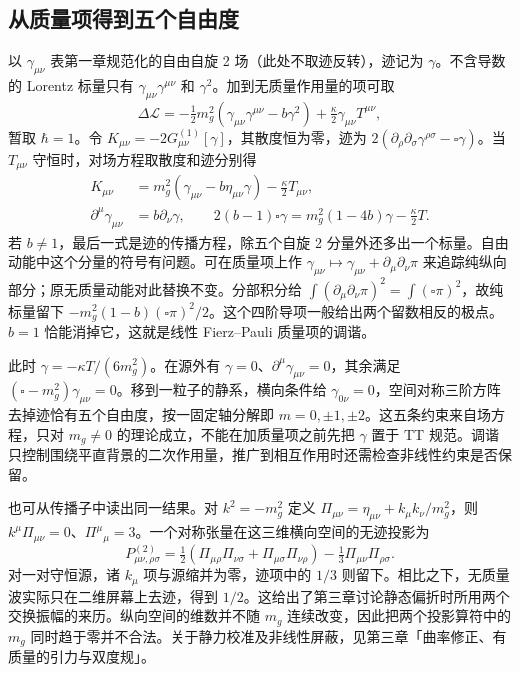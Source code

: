 \subsection{从质量项得到五个自由度}

以 $\gamma_{\mu\nu}$ 表第一章规范化的自由自旋 2 场（此处不取迹反转），迹记为 $\gamma$。不含导数的 Lorentz 标量只有 $\gamma_{\mu\nu}\gamma^{\mu\nu}$ 和 $\gamma^2$。加到无质量作用量的项可取
\[
 \Delta\mathscr L=-\tfrac12 m_g^2
        (\gamma_{\mu\nu}\gamma^{\mu\nu}-b\gamma^2)
        +\tfrac{\kappa}{2}\gamma_{\mu\nu}T^{\mu\nu},
\]
暂取 $\hbar=1$。令 $K_{\mu\nu}=-2G_{\mu\nu}^{(1)}[\gamma]$，其散度恒为零，迹为 $2(\partial_\rho\partial_\sigma\gamma^{\rho\sigma}-\square\gamma)$。当 $T_{\mu\nu}$ 守恒时，对场方程取散度和迹分别得
\begin{align*}
 K_{\mu\nu}&=m_g^2(\gamma_{\mu\nu}-b\eta_{\mu\nu}\gamma)-\tfrac\kappa2 T_{\mu\nu},\\
 \partial^\mu\gamma_{\mu\nu}&=b\partial_\nu\gamma,\qquad
 2(b-1)\square\gamma=m_g^2(1-4b)\gamma-\tfrac\kappa2 T .
\end{align*}
若 $b\ne1$，最后一式是迹的传播方程，除五个自旋 2 分量外还多出一个标量。自由动能中这个分量的符号有问题。可在质量项上作 $\gamma_{\mu\nu}\mapsto\gamma_{\mu\nu}+\partial_\mu\partial_\nu\pi$ 来追踪纯纵向部分；原无质量动能对此替换不变。分部积分给 $\int(\partial_\mu\partial_\nu\pi)^2=\int(\square\pi)^2$，故纯标量留下 $-m_g^2(1-b)(\square\pi)^2/2$。这个四阶导项一般给出两个留数相反的极点。$b=1$ 恰能消掉它，这就是线性 Fierz--Pauli 质量项的调谐。

此时 $\gamma=-\kappa T/(6m_g^2)$。在源外有 $\gamma=0$、$\partial^\mu\gamma_{\mu\nu}=0$，其余满足 $(\square-m_g^2)\gamma_{\mu\nu}=0$。移到一粒子的静系，横向条件给 $\gamma_{0\nu}=0$，空间对称三阶方阵去掉迹恰有五个自由度，按一固定轴分解即 $m=0,\pm1,\pm2$。这五条约束来自场方程，只对 $m_g\ne0$ 的理论成立，不能在加质量项之前先把 $\gamma$ 置于 TT 规范。调谐只控制围绕平直背景的二次作用量，推广到相互作用时还需检查非线性约束是否保留。

也可从传播子中读出同一结果。对 $k^2=-m_g^2$ 定义 $\Pi_{\mu\nu}=\eta_{\mu\nu}+k_\mu k_\nu/m_g^2$，则 $k^\mu\Pi_{\mu\nu}=0$、$\Pi^\mu{}_\mu=3$。一个对称张量在这三维横向空间的无迹投影为
\[
 P^{(2)}_{\mu\nu,\rho\sigma}
 =\tfrac12(\Pi_{\mu\rho}\Pi_{\nu\sigma}+\Pi_{\mu\sigma}\Pi_{\nu\rho})
  -\tfrac13\Pi_{\mu\nu}\Pi_{\rho\sigma}.
\]
对一对守恒源，诸 $k_\mu$ 项与源缩并为零，迹项中的 $1/3$ 则留下。相比之下，无质量波实际只在二维屏幕上去迹，得到 $1/2$。这给出了第三章讨论静态偏折时所用两个交换振幅的来历。纵向空间的维数并不随 $m_g$ 连续改变，因此把两个投影算符中的 $m_g$ 同时趋于零并不合法。关于静力校准及非线性屏蔽，见第三章「曲率修正、有质量的引力与双度规」。

